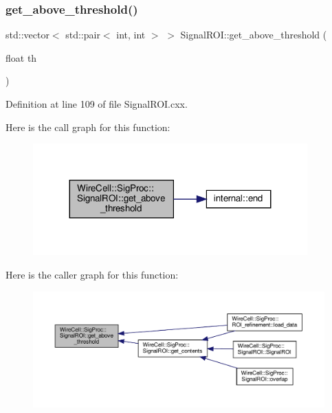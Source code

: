 \subsubsection{\texorpdfstring{get\+\_\+above\+\_\+threshold()}{get\_above\_threshold()}}
{\footnotesize\ttfamily std\+::vector$<$ std\+::pair$<$ int, int $>$ $>$ Signal\+R\+O\+I\+::get\+\_\+above\+\_\+threshold (\begin{DoxyParamCaption}\item[{float}]{th }\end{DoxyParamCaption})}



Definition at line 109 of file Signal\+R\+O\+I.\+cxx.

Here is the call graph for this function\+:
\nopagebreak
\begin{figure}[H]
\begin{center}
\leavevmode
\includegraphics[width=299pt]{class_wire_cell_1_1_sig_proc_1_1_signal_r_o_i_ad7adf2e8940e21c808371578e16eeac8_cgraph}
\end{center}
\end{figure}
Here is the caller graph for this function\+:
\nopagebreak
\begin{figure}[H]
\begin{center}
\leavevmode
\includegraphics[width=350pt]{class_wire_cell_1_1_sig_proc_1_1_signal_r_o_i_ad7adf2e8940e21c808371578e16eeac8_icgraph}
\end{center}
\end{figure}
\mbox{\label{class_wire_cell_1_1_sig_proc_1_1_signal_r_o_i_aed20acd4564c60d6ebfc1d0c0b3c27b6}} 
